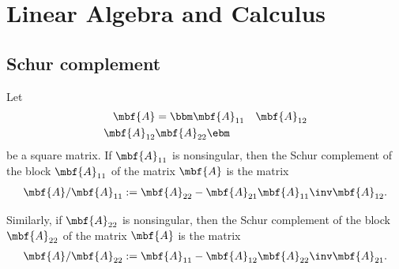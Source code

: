 \chapter{Linear Algebra and Calculus}
\section{Schur complement}
\begin{mytheorem}    
    Let 
    \begin{align}
        \mbf{A} &= 
        \bbm
            \mbf{A}_{11} & \mbf{A}_{12}\\
            \mbf{A}_{12} & \mbf{A}_{22}
        \ebm
    \end{align}
    be a square matrix. If $\mbf{A}_{11}$ is nonsingular, then the Schur complement of the block $\mbf{A}_{11}$ of the matrix $\mbf{A}$ is the matrix
    \begin{align}
        \mbf{A}/\mbf{A}_{11} := \mbf{A}_{22} - \mbf{A}_{21}\mbf{A}_{11}\inv\mbf{A}_{12}.
    \end{align}
    
    Similarly, if $\mbf{A}_{22}$ is nonsingular, then the Schur complement of the block $\mbf{A}_{22}$ of the matrix $\mbf{A}$ is the matrix
    \begin{align}
        \mbf{A}/\mbf{A}_{22} := \mbf{A}_{11} - \mbf{A}_{12}\mbf{A}_{22}\inv\mbf{A}_{21}.
    \end{align}
\end{mytheorem}


